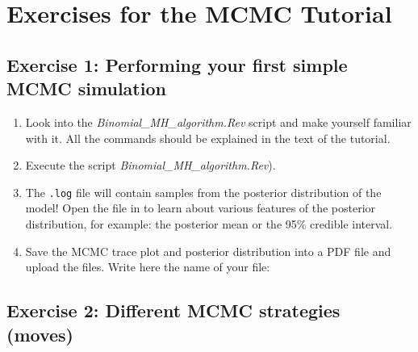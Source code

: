 \section{Exercises for the MCMC Tutorial}


\subsection{Exercise 1: Performing your first simple MCMC simulation}

\begin{enumerate}[label=\textnormal{\arabic*)}]
	\item Look into the \emph{Binomial\_MH\_algorithm.Rev} script and make yourself familiar with it. All the commands should be explained in the text of the tutorial. 
	\item Execute the script \emph{Binomial\_MH\_algorithm.Rev}).
	\item The \texttt{.log} file will contain samples from the posterior distribution of the model! Open the file in \Tracer to learn about various features of the posterior distribution, for example: the posterior mean or the 95\% credible interval.
	\item Save the MCMC trace plot and posterior distribution into a PDF file and upload the files. Write here the name of your file:\medskip\\
\TextField[name=mcmc_trace,backgroundcolor=TextFieldBackgroundColor,color=TextFieldTextColor,bordercolor=TextFieldBoxColor,height=1cm,width=\TextFieldWidth,multiline=true]{}
\end{enumerate}

\subsection{Exercise 2: Different MCMC strategies (moves)}

